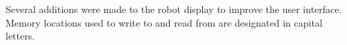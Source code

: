 Several additions were made to the robot display to improve the user
interface. Memory locations used to write to and read from are designated in capital letters.

\begin{figure}[h!]
  \centering \cprotect {}
\end{figure}

